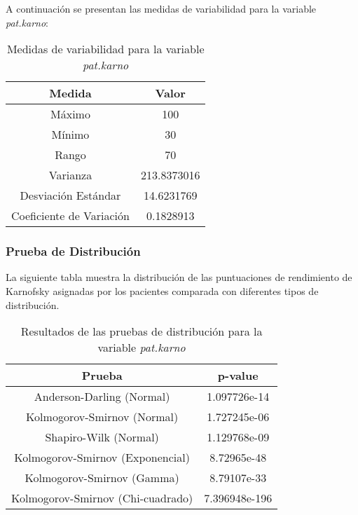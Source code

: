 \documentclass[a4paper,12pt]{article}
\begin{document}
    A continuación se presentan las medidas de variabilidad para la variable \textit{pat.karno}:
    
    \begin{table}[h!]
        \centering
        \begin{tabular}{|c|c|}
            \hline
            \textbf{Medida} & \textbf{Valor} \\
            \hline
            Máximo & 100 \\
            \hline
            Mínimo & 30 \\
            \hline
            Rango & 70 \\
            \hline
            Varianza & 213.8373016 \\
            \hline
            Desviación Estándar & 14.6231769 \\
            \hline
            Coeficiente de Variación & 0.1828913 \\
            \hline
        \end{tabular}
        \caption{Medidas de variabilidad para la variable \textit{pat.karno}}
        \label{tab:medidas_variabilidad_pat_karno}
    \end{table}

    \subsubsection*{Prueba de Distribución}

    La siguiente tabla muestra la distribución de las puntuaciones de rendimiento de Karnofsky asignadas por los pacientes comparada con diferentes tipos de distribución.
    
    \begin{table}[h!]
        \centering
        \begin{tabular}{|c|c|}
            \hline
            \textbf{Prueba} & \textbf{p-value} \\
            \hline
            Anderson-Darling (Normal) & 1.097726e-14 \\
            \hline
            Kolmogorov-Smirnov (Normal) & 1.727245e-06 \\
            \hline
            Shapiro-Wilk (Normal) & 1.129768e-09 \\
            \hline
            Kolmogorov-Smirnov (Exponencial) & 8.72965e-48 \\
            \hline
            Kolmogorov-Smirnov (Gamma) & 8.79107e-33 \\
            \hline
            Kolmogorov-Smirnov (Chi-cuadrado) & 7.396948e-196 \\
            \hline
        \end{tabular}
        \caption{Resultados de las pruebas de distribución para la variable \textit{pat.karno}}
        \label{tab:pruebas_distribucion_pat_karno}
    \end{table}
\end{document}
